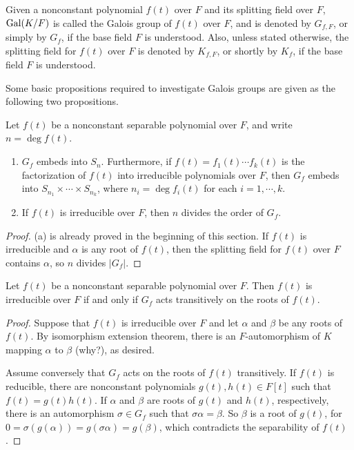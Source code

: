 \begin{nota}
    Given a nonconstant polynomial $f(t)$ over $F$ and its splitting field over $F$, ${\textrm{Gal}({K/F})}$ is called the Galois group of $f(t)$ over $F$, and is denoted by $G_{f, F}$, or simply by $G_f$, if the base field $F$ is understood.
    Also, unless stated otherwise, the splitting field for $f(t)$ over $F$ is denoted by $K_{f, F}$, or shortly by $K_f$, if the base field $F$ is understood.
\end{nota}

Some basic propositions required to investigate Galois groups are given as the following two propositions.
\begin{prop}
    Let $f(t)$ be a nonconstant separable polynomial over $F$, and write $n=\deg f(t)$.
    \begin{enumerate}
        \item[(a)]
        {
            $G_f$ embeds into $S_n$.
            Furthermore, if $f(t)=f_1(t)\cdots f_k(t)$ is the factorization of $f(t)$ into irreducible polynomials over $F$, then $G_f$ embeds into $S_{n_1}\times\cdots\times S_{n_k}$, where $n_i=\deg f_i(t)$ for each $i=1, \cdots, k$.
        }
        \item[(b)]
        {
            If $f(t)$ is irreducible over $F$, then $n$ divides the order of $G_f$.
        }
    \end{enumerate}
\end{prop}
\begin{proof}
    (a) is already proved in the beginning of this section.
    If $f(t)$ is irreducible and $\alpha$ is any root of $f(t)$, then the splitting field for $f(t)$ over $F$ contains $\alpha$, so $n$ divides $|G_f|$.
\end{proof}
\begin{prop}
    Let $f(t)$ be a nonconstant separable polynomial over $F$.
    Then $f(t)$ is irreducible over $F$ if and only if $G_f$ acts transitively on the roots of $f(t)$.
\end{prop}
\begin{proof}
    Suppose that $f(t)$ is irreducible over $F$ and let $\alpha$ and $\beta$ be any roots of $f(t)$.
    By isomorphism extension theorem, there is an $F$-automorphism of $K$ mapping $\alpha$ to $\beta$ \color{brown}(why?)\color{black}, as desired.

    Assume conversely that $G_f$ acts on the roots of $f(t)$ transitively.
    If $f(t)$ is reducible, there are nonconstant polynomials $g(t), h(t)\in F[t]$ such that $f(t)=g(t)h(t)$.
    If $\alpha$ and $\beta$ are roots of $g(t)$ and $h(t)$, respectively, there is an automorphism $\sigma\in G_f$ such that $\sigma\alpha=\beta$.
    So $\beta$ is a root of $g(t)$, for $0=\sigma(g(\alpha))=g(\sigma\alpha)=g(\beta)$, which contradicts the separability of $f(t)$.
\end{proof}

